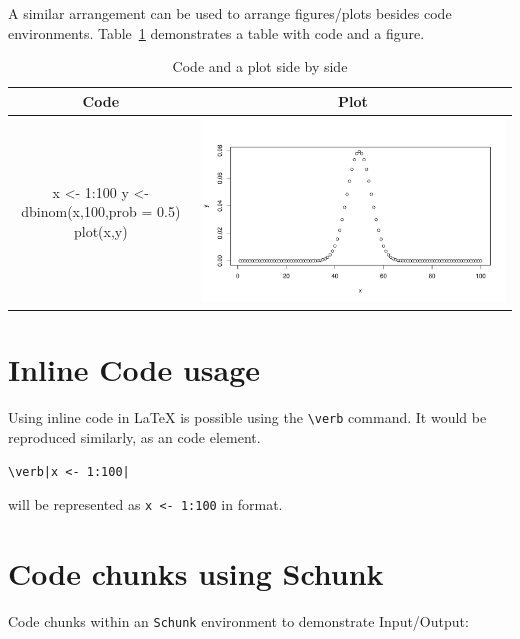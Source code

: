 A similar arrangement can be used to arrange figures/plots besides code environments.
Table~\ref{table:3} demonstrates a table with code and a figure.
\begin{table}[htbp]
  \centering
  \begin{tabular}{| c | c |}
  \hline
  Code & Plot\\
    \hline
    \begin{minipage}{0.45\textwidth}
\vspace{1mm}
\begin{example}
x <- 1:100
y <- dbinom(x,100,prob = 0.5)
plot(x,y)
\end{example}
    \end{minipage} &
    \begin{minipage}{0.45\textwidth}
    \centering
    \includegraphics[width=1\textwidth]{binom}
    \end{minipage}\\
    \hline
  \end{tabular}
  \caption{Code and a plot side by side}
  \label{table:3}
\end{table}


\section{Inline Code usage}

Using inline code in LaTeX is possible using the \verb|\verb| command.
It would be reproduced similarly, as an  code element.
\begin{verbatim}
\verb|x <- 1:100|
\end{verbatim}
will be represented as \verb|x <- 1:100| in  format.

\section{Code chunks using Schunk}
Code chunks within an \verb|Schunk| environment to demonstrate Input/Output:

